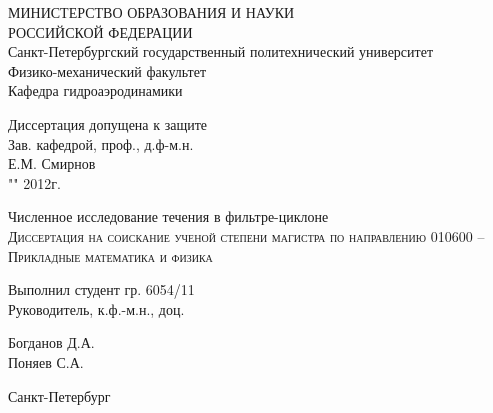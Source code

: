\renewcommand\normalsize{\fontsize{12pt}{14pt}\selectfont}
\begin{titlepage}
	\begin{center}
		\small{МИНИСТЕРСТВО ОБРАЗОВАНИЯ И НАУКИ \\ РОССИЙСКОЙ ФЕДЕРАЦИИ \\
Санкт-Петербургский государственный политехнический университет \\
Физико-механический факультет \\
Кафедра гидроаэродинамики}\\
		\vspace{0.05\textheight}
	\end{center}
	\begin{flushright}
		\normalsize
			Диссертация допущена к защите \\
			Зав. кафедрой, проф., д.ф-м.н.\\
			\underline{\hspace{7em}} Е.М. Смирнов \\
			"\underline{\hspace{2em}}" \underline{\hspace{9em}} 2012г. \\
	\end{flushright}
	\begin{center}
		\vspace{0.1\textheight}
		\large{Численное исследование течения в фильтре-циклоне}\\
		\vspace{0.01\textheight}
		\normalsize
		\textsc{Диссертация на соискание ученой степени магистра по направлению 010600 – Прикладные математика и физика}
		\vspace{0.25\textheight}
	\end{center}
	\begin{minipage}{0.48\textwidth}
		\begin{flushleft}
			Выполнил студент гр. 6054/11\\
			Руководитель, к.ф.-м.н., доц.\\
		\end{flushleft}
	\end{minipage}
	\begin{minipage}{0.5\textwidth}
		\begin{flushright}
			Богданов Д.А. \\
			Поняев С.А. \\
		\end{flushright}
	\end{minipage}
	\vspace{0.1\textheight}
	\begin{center}
		Санкт-Петербург \\
		\the\year
	\end{center}
\end{titlepage}
\newpage
\renewcommand\normalsize{\fontsize{14pt}{24pt}\selectfont}